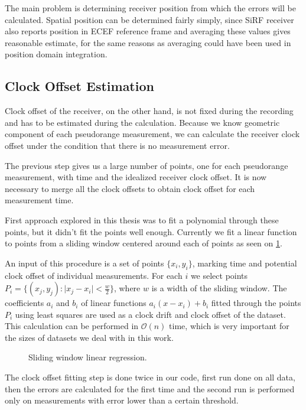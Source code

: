 The main problem is determining receiver position from which the errors will be
calculated.
Spatial position can be determined fairly simply, since SiRF receiver also
reports position in ECEF reference frame and averaging these values gives
reasonable estimate, for the same reasons as averaging could have been used in
position domain integration.

\subsection{Clock Offset Estimation}
\label{sec:impl-clock-offsets}
Clock offset of the receiver, on the other hand, is not fixed during the recording
and has to be estimated during the calculation.
Because we know geometric component of each pseudorange measurement, we can
calculate the receiver clock offset under the condition that there is no measurement
error.

The previous step gives us a large number of points, one for each pseudorange
measurement, with time and the idealized receiver clock offset.
It is now necessary to merge all the clock offsets to obtain clock offset for
each measurement time.

First approach explored in this thesis was to fit a polynomial through these
points, but it didn't fit the points well enough.
Currently we fit a linear function to points from a sliding window centered
around each of points as seen on \cref{fig:sliding-window-linear-regression}.

An input of this procedure is a set of points \(\{x_i, y_i\}\), marking 
time and potential clock offset of individual measurements.
For each \(i\) we select points \(P_i = \{(x_j, y_j) : \lvert{}x_j - x_i\rvert < \frac{w}{2}\}\), where
\(w\) is a width of the sliding window.
The coefficients \(a_i\) and \(b_i\) of linear functions
\(a_i (x - x_i) + b_i\) fitted through the points \(P_i\) using least squares
are used as a clock drift and clock offset of the dataset.
This calculation can be performed in \(\mathcal{O}(n)\) time, which is very
important for the sizes of datasets we deal with in this work.


\begin{figure}[h]
	\centering
	
	\caption{Sliding window linear regression.}
	\label{fig:sliding-window-linear-regression}
\end{figure}

The clock offset fitting step is done twice in our code, first run done on
all data, then the errors are calculated for the first time and the second run
is performed only on measurements with error lower than a certain threshold.

